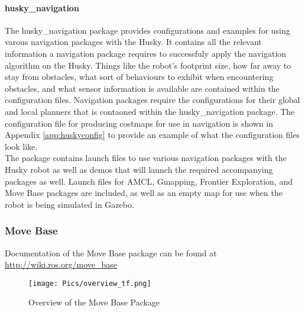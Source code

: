 
\paragraph{husky\_navigation}

The husky\_navigation package provides configurations and examples for using varous navigation packages with the Husky. It contains all the relevant information a navigation package requires to successfuly apply the navigation algorithm on the Husky. Things like the robot's footprint size, how far away to stay from obstacles, what sort of behaviours to exhibit when encountering obstacles, and what sensor information is available are contained within the configuration files. Navigation packages require the configurations for their global and local planners that is contaoned within the husky\_navigation package. The configuration file for producing costmaps for use in navigation is shown in Appendix \ref{app:huskyconfig} to provide an example of what the configuration files look like.\\

The package contains launch files to use various navigation packages with the Husky robot as well as demos that will launch the required accompanying packages as well. Launch files for AMCL, Gmapping, Frontier Exploration, and Move Base packages are included, as well as an empty map for use when the robot is being simulated in Gazebo.\\ 

\subsubsection{Move Base}

Documentation of the Move Base package can be found at \url{http://wiki.ros.org/move_base}\\

\begin{figure}[H]
    \centering
    \texttt{[image: Pics/overview\_tf.png]}
    \caption{Overview of the Move Base Package \cite{rosmovebase}}
    \label{fig:movebaseoverview}
\end{figure}

